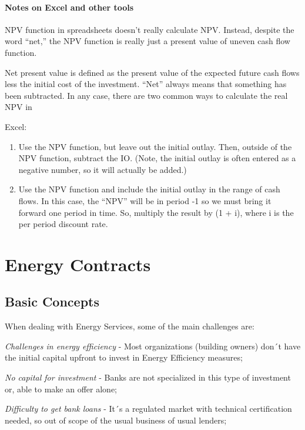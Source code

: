 \documentclass[]{book}
\providecommand{\tightlist}{%
  \setlength{\itemsep}{0pt}\setlength{\parskip}{0pt}}
\theoremstyle{definition}
\theoremstyle{definition}
\theoremstyle{definition}
\theoremstyle{remark}
\begin{document}
\subsubsection{Notes on Excel and other
tools}\label{notes-on-excel-and-other-tools}

NPV function in spreadsheets doesn't really calculate NPV. Instead,
despite the word ``net,'' the NPV function is really just a present
value of uneven cash flow function.

Net present value is defined as the present value of the expected future
cash flows less the initial cost of the investment. ``Net'' always means
that something has been subtracted. In any case, there are two common
ways to calculate the real NPV in

Excel:

\begin{enumerate}
\def\labelenumi{\arabic{enumi}.}
\tightlist
\item
  Use the NPV function, but leave out the initial outlay. Then, outside
  of the NPV function, subtract the IO. (Note, the initial outlay is
  often entered as a negative number, so it will actually be added.)
\item
  Use the NPV function and include the initial outlay in the range of
  cash flows. In this case, the ``NPV'' will be in period -1 so we must
  bring it forward one period in time. So, multiply the result by (1 +
  i), where i is the per period discount rate.
\end{enumerate}

\chapter{Energy Contracts}\label{energy-contracts-1}

\section{Basic Concepts}\label{basic-concepts-1}

When dealing with Energy Services, some of the main challenges are:

\emph{Challenges in energy efficiency} - Most organizations (building
owners) don´t have the initial capital upfront to invest in Energy
Efficiency measures;

\emph{No capital for investment} - Banks are not specialized in this
type of investment or, able to make an offer alone;

\emph{Difficulty to get bank loans} - It´s a regulated market with
technical certification needed, so out of scope of the usual business of
usual lenders;
\end{document}
